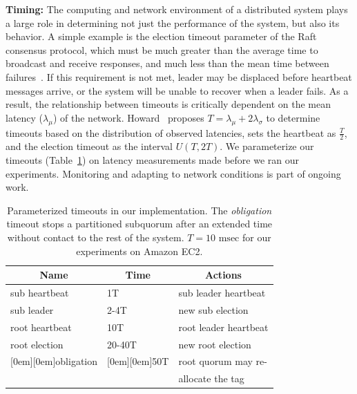 \documentclass[letterpaper,10pt,twocolumn]{article}
\newcommand{\sub}{subquorum\xspace}
\newcommand{\roo}{root quorum\xspace}
\newcommand{\para}[1]{\vspace{.04in}\noindent\textbf{#1}}
\def\mcn#1{\multicolumn{1}{c}{#1}}
\def\lb#1{\raisebox{-1.5ex}[0em][0em]{#1}}
\begin{document}
\para{Timing:} The computing and network environment of a distributed system
plays a large role in determining not just the performance of the system, but
also its behavior.
A simple example is the election timeout parameter of the Raft consensus
protocol, which must be much greater than the average time to
broadcast and receive responses, and much less than the mean time
between failures~\cite{raft,etcd}.
If this requirement is not met,
leader may be displaced before heartbeat messages arrive, or the system will be
unable to recover when a leader fails.
As a result, the relationship between timeouts is critically dependent on the mean
latency ($\lambda_{\mu}$) of the network.
Howard~\cite{raftRefloated} proposes  $T = \lambda_{\mu} +
2\lambda_{\sigma}$ to determine timeouts based on the distribution of observed
latencies, sets the heartbeat as $\frac {T} {2}$, and the election timeout as
the interval $U(T,2T)$.
We parameterize our timeouts (Table~\ref{tab:ticks}) on
latency measurements made before we ran our experiments.
Monitoring and adapting to network conditions is part of ongoing work.

\begin{table}[t]
  \centering
  \begin{tabular}{l|l|l} \hline
\mcn{Name} & \mcn{Time} & \mcn{Actions} \\ \hline
sub heartbeat& 1T & sub leader heartbeat\\
sub leader & 2-4T & new sub election\\ \hline
root heartbeat & 10T & root leader heartbeat \\
root election & 20-40T & new root election \\ \hline
\lb{obligation} & \lb{50T} & \roo may re- \\
 &  & allocate the tag
  \end{tabular}
  \caption{Parameterized timeouts in our implementation. The \emph{obligation} timeout
    stops a partitioned \sub after an extended time without contact to the
    rest of the system. $T=10 \mbox{ msec}$ for our experiments on Amazon EC2.}
  \label{tab:ticks}
\end{table}
\end{document}

